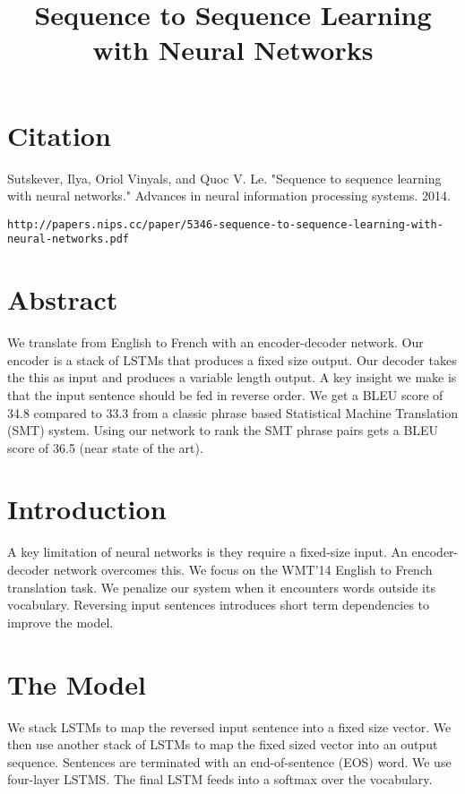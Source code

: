 \documentclass[a4paper]{article}
\title{Sequence to Sequence Learning with Neural Networks}
\date{}
\begin{document}
\maketitle

\section{Citation}
Sutskever, Ilya, Oriol Vinyals, and Quoc V. Le. "Sequence to sequence learning with neural networks." Advances in neural information processing systems. 2014.

\begin{verbatim}
http://papers.nips.cc/paper/5346-sequence-to-sequence-learning-with-neural-networks.pdf
\end{verbatim}

\section{Abstract}
We translate from English to French with an encoder-decoder network. Our encoder
is a stack of LSTMs that produces a fixed size output. Our decoder takes
the this as input and produces a variable length output. A key insight we
make is that the input sentence should be fed in reverse order. We get a BLEU
score of 34.8 compared to 33.3 from a classic phrase based Statistical
Machine Translation (SMT) system. Using our network to rank the SMT phrase
pairs gets a BLEU score of 36.5 (near state of the art).

\section{Introduction}
A key limitation of neural networks is they require a fixed-size input. An
encoder-decoder network overcomes this. We focus on the WMT'14 English to
French translation task. We penalize our system when it encounters words
outside its vocabulary. Reversing input sentences introduces short term
dependencies to improve the model.

\section{The Model}
We stack LSTMs to map the reversed input sentence into a fixed size vector.
We then use another stack of LSTMs to map the fixed sized vector into an
output sequence. Sentences are terminated with an end-of-sentence (EOS) word.
We use four-layer LSTMS. The final LSTM feeds into a softmax over the
vocabulary.
\end{document}
